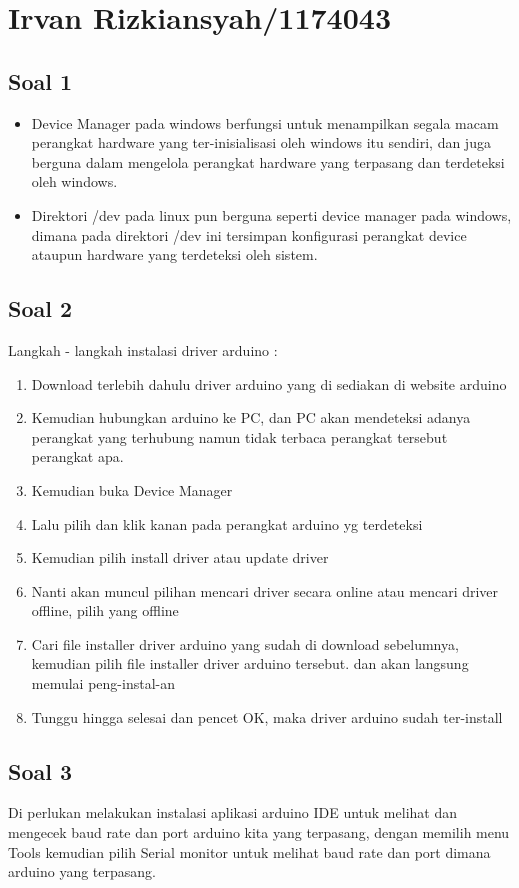 \section{Irvan Rizkiansyah/1174043}
	\subsection{Soal 1}
		\begin{itemize}
			\item Device Manager pada windows berfungsi untuk menampilkan segala macam perangkat hardware yang ter-inisialisasi oleh windows itu sendiri, dan juga berguna dalam mengelola perangkat hardware yang terpasang dan terdeteksi oleh windows.
			
			\item Direktori /dev pada linux pun berguna seperti device manager pada windows, dimana pada direktori /dev ini tersimpan konfigurasi perangkat device ataupun hardware yang terdeteksi oleh sistem.
			
		\end{itemize}
	\subsection{Soal 2}
	Langkah - langkah instalasi driver arduino :
		\begin{enumerate}
			\item Download terlebih dahulu driver arduino yang di sediakan di website arduino
			\item Kemudian hubungkan arduino ke PC, dan PC akan mendeteksi adanya perangkat yang terhubung namun tidak terbaca perangkat tersebut perangkat apa.
			\item Kemudian buka Device Manager
			\item Lalu pilih dan klik kanan pada perangkat arduino yg terdeteksi
			\item Kemudian pilih install driver atau update driver
			\item Nanti akan muncul pilihan mencari driver secara online atau mencari driver offline, pilih yang offline
			\item Cari file installer driver arduino yang sudah di download sebelumnya, kemudian pilih file installer driver arduino tersebut. dan akan langsung memulai peng-instal-an
			\item Tunggu hingga selesai dan pencet OK, maka driver arduino sudah ter-install
			
		\end{enumerate}
	\subsection{Soal 3}
	Di perlukan melakukan instalasi aplikasi arduino IDE untuk melihat dan mengecek baud rate dan port arduino kita yang terpasang, dengan memilih menu Tools kemudian pilih Serial monitor untuk melihat baud rate dan port dimana arduino yang terpasang.
	
